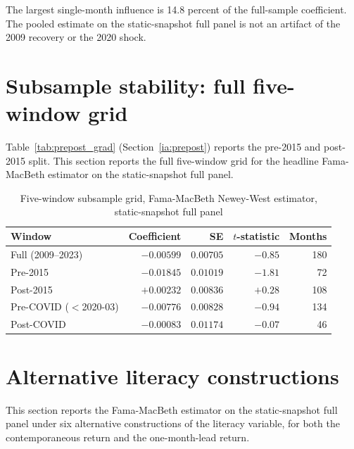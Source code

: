 \documentclass[12pt]{article}
\begin{document}
\noindent The largest single-month influence is 14.8 percent of the full-sample coefficient. The pooled estimate on the static-snapshot full panel is not an artifact of the 2009 recovery or the 2020 shock.

\section{Subsample stability: full five-window grid}
\label{ia:subsample}

Table~\ref{tab:prepost_grad} (Section~\ref{ia:prepost}) reports the pre-2015 and post-2015 split. This section reports the full five-window grid for the headline Fama-MacBeth estimator on the static-snapshot full panel.

\begin{table}[h]
\centering
\caption{Five-window subsample grid, Fama-MacBeth Newey-West estimator, static-snapshot full panel}
\footnotesize
\begin{tabular}{lrrrr}
\toprule
Window & Coefficient & SE & $t$-statistic & Months \\
\midrule
Full (2009--2023)        & $-0.00599$ & $0.00705$ & $-0.85$ & 180 \\
Pre-2015                 & $-0.01845$ & $0.01019$ & $-1.81$ & 72 \\
Post-2015                & $+0.00232$ & $0.00836$ & $+0.28$ & 108 \\
Pre-COVID ($<$2020-03)   & $-0.00776$ & $0.00828$ & $-0.94$ & 134 \\
Post-COVID               & $-0.00083$ & $0.01174$ & $-0.07$ & 46 \\
\bottomrule
\end{tabular}
\end{table}

\section{Alternative literacy constructions}
\label{ia:altlit}

This section reports the Fama-MacBeth estimator on the static-snapshot full panel under six alternative constructions of the literacy variable, for both the contemporaneous return and the one-month-lead return.
\end{document}
